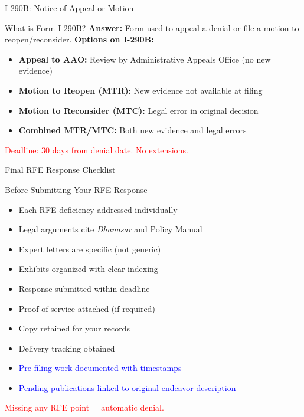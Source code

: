 \documentclass[11pt]{beamer}
\begin{document}
	\begin{frame}{I-290B: Notice of Appeal or Motion}
		\scriptsize
		\begin{block}{What is Form I-290B?}
			\textbf{Answer:} Form used to appeal a denial or file a motion to reopen/reconsider.
			\vspace{0.2cm}
			\textbf{Options on I-290B:}
			\begin{itemize}
				\item \textbf{Appeal to AAO:} Review by Administrative Appeals Office (no new evidence)
				\item \textbf{Motion to Reopen (MTR):} New evidence not available at filing
				\item \textbf{Motion to Reconsider (MTC):} Legal error in original decision
				\item \textbf{Combined MTR/MTC:} Both new evidence and legal errors
			\end{itemize}
			\textcolor{red}{Deadline: 30 days from denial date. No extensions.}
		\end{block}
	\end{frame}
	
	
	\begin{frame}{Final RFE Response Checklist}
		\scriptsize
		\begin{block}{Before Submitting Your RFE Response}
			\begin{itemize}
				\item [$\square$] Each RFE deficiency addressed individually
				\item [$\square$] Legal arguments cite \textit{Dhanasar} and Policy Manual
				\item [$\square$] Expert letters are specific (not generic)
				\item [$\square$] Exhibits organized with clear indexing
				\item [$\square$] Response submitted within deadline
				\item [$\square$] Proof of service attached (if required)
				\item [$\square$] Copy retained for your records
				\item [$\square$] Delivery tracking obtained
				\item [$\square$] \textcolor{blue}{Pre-filing work documented with timestamps}
				\item [$\square$] \textcolor{blue}{Pending publications linked to original endeavor description}
			\end{itemize}
			\textcolor{red}{Missing any RFE point = automatic denial.}
		\end{block}
	\end{frame}
	
\end{document}
